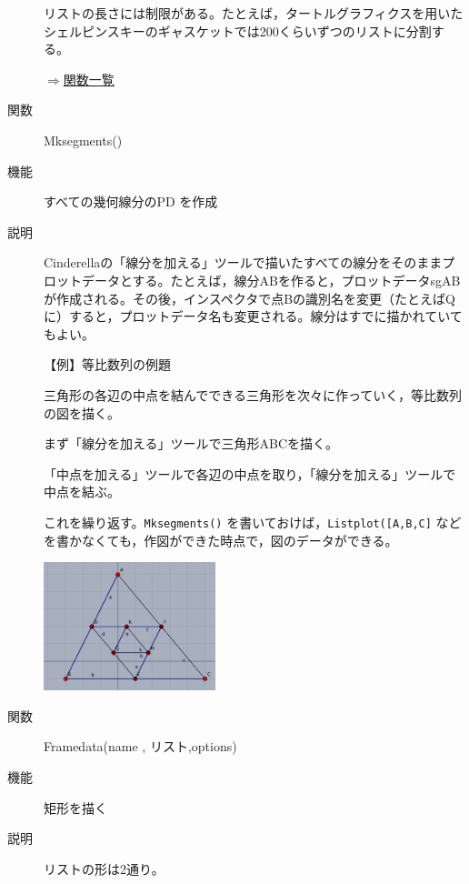 \documentclass[papersize,a4paper,12pt,uplatex]{jsarticle}
\begin{document}
\begin{description}
\vspace{\baselineskip}
\hspace{20mm}

\vspace{\baselineskip}
 リストの長さには制限がある。たとえば，タートルグラフィクスを用いたシェルピンスキーのギャスケットでは200くらいずつのリストに分割する。
 
 \hspace{20mm}\scalebox{0.9}{ }
\begin{flushright}  \hyperlink{functionlist}{$\Rightarrow$関数一覧}\end{flushright}

\vspace{\baselineskip}
\hypertarget{mksegments}{}
\item[関数]  Mksegments()
\item[機能]  すべての幾何線分のPD を作成
\item[説明]  Cinderellaの「線分を加える」ツールで描いたすべての線分をそのままプロットデータとする。たとえば，線分ABを作ると，プロットデータsgABが作成される。その後，インスペクタで点Bの識別名を変更（たとえばQに）すると，プロットデータ名も変更される。線分はすでに描かれていてもよい。

\vspace{\baselineskip}
【例】等比数列の例題

三角形の各辺の中点を結んでできる三角形を次々に作っていく，等比数列の図を描く。

まず「線分を加える」ツールで三角形ABCを描く。

「中点を加える」ツールで各辺の中点を取り，「線分を加える」ツールで中点を結ぶ。

これを繰り返す。\verb|Mksegments()| を書いておけば，\verb|Listplot([A,B,C]| などを書かなくても，作図ができた時点で，図のデータができる。

\includegraphics[bb=0.00 0.00 438.02 327.02,width=5cm]{Fig/gpro01.pdf}     

\vspace{\baselineskip}
\hypertarget{framedata}{}
\item[関数]  Framedata(name , リスト,options)
\item[機能]  矩形を描く
\item[説明]  リストの形は2通り。


\end{description}
\end{document}
